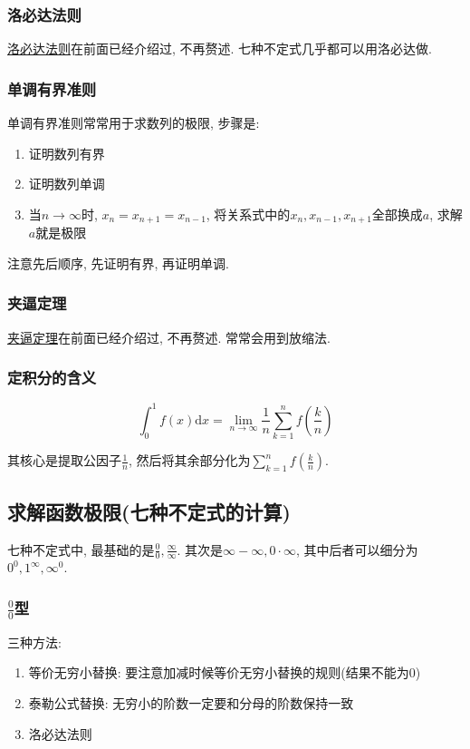 \subsubsection{洛必达法则}
\hyperref[洛必达法则]{洛必达法则}在前面已经介绍过, 不再赘述. 七种不定式几乎都可以用洛必达做.
\subsubsection{单调有界准则}\label{单调有界准则算极限}
单调有界准则常常用于求数列的极限, 步骤是:
\begin{enumerate}
\item 证明数列有界
\item 证明数列单调
\item 当$ n\rightarrow \infty $时, $ x_{n}=x_{n+1}=x_{n-1} $, 将关系式中的$ x_{n}, x_{n-1}, x_{n+1} $全部换成$ a $, 求解$ a $就是极限
\end{enumerate}\par
注意先后顺序, 先证明有界, 再证明单调.
\subsubsection{夹逼定理}
\hyperref[夹逼定理]{夹逼定理}在前面已经介绍过, 不再赘述. 常常会用到放缩法.
\subsubsection{定积分的含义}
\begin{equation*}
\int_{0}^{1}f(x)\mathrm{d}x=\lim\limits_{n \rightarrow \infty}\frac{1}{n}\sum_{k=1}^{n}f(\frac{k}{n})
\end{equation*}\par
其核心是提取公因子$ \frac{1}{n} $, 然后将其余部分化为$ \sum_{k=1}^{n}f(\frac{k}{n}) $.
\subsection{求解函数极限(七种不定式的计算)}
七种不定式中, 最基础的是$ \frac{0}{0}, \frac{\infty}{\infty} $. 其次是$ \infty-\infty, 0\cdot\infty $, 其中后者可以细分为$ 0^{0}, 1^{\infty}, \infty^{0} $.
\subsubsection{$ \frac{0}{0} $型}
三种方法:
\begin{enumerate}
\item 等价无穷小替换: 要注意加减时候等价无穷小替换的规则(结果不能为$ 0 $)
\item 泰勒公式替换: 无穷小的阶数一定要和分母的阶数保持一致
\item 洛必达法则
\end{enumerate}
